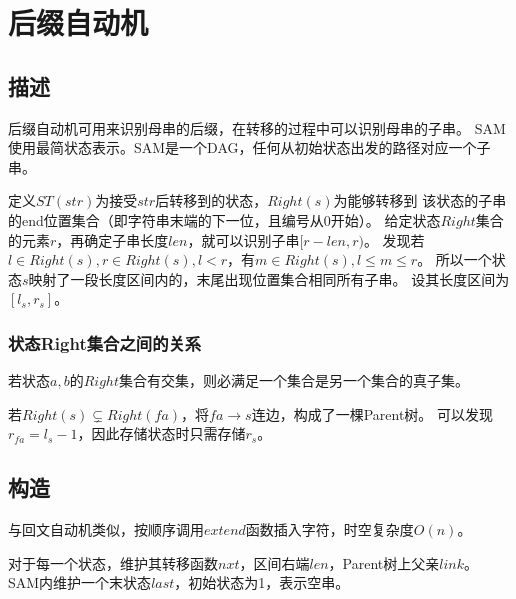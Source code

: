 \section{后缀自动机}
\subsection{描述}
后缀自动机可用来识别母串的后缀，在转移的过程中可以识别母串的子串。
SAM使用最简状态表示。SAM是一个DAG，任何从初始状态出发的路径对应一个子串。

定义$ST(str)$为接受$str$后转移到的状态，$Right(s)$为能够转移到
该状态的子串的end位置集合（即字符串末端的下一位，且编号从0开始）。
给定状态$Right$集合的元素$r$，再确定子串长度$len$，就可以识别子串$[r-len,r)$。
发现若$l\in Right(s),r\in Right(s),l<r$，有$m\in Right(s),l\leq m \leq r$。
所以一个状态$s$映射了一段长度区间内的，末尾出现位置集合相同所有子串。
设其长度区间为$[l_s,r_s]$。

\subsubsection{状态Right集合之间的关系}
\begin{property}\label{SRP}
若状态$a,b$的$Right$集合有交集，则必满足一个集合是另一个集合的真子集。
\end{property}

若$Right(s)\subsetneq Right(fa)$，将$fa\rightarrow s$连边，构成了一棵Parent树。
可以发现$r_{fa}=l_s-1$，因此存储状态时只需存储$r_s$。
\subsection{构造}
与回文自动机类似，按顺序调用$extend$函数插入字符，时空复杂度$O(n)$。

对于每一个状态，维护其转移函数$nxt$，区间右端$len$，Parent树上父亲$link$。
SAM内维护一个末状态$last$，初始状态为1，表示空串。

